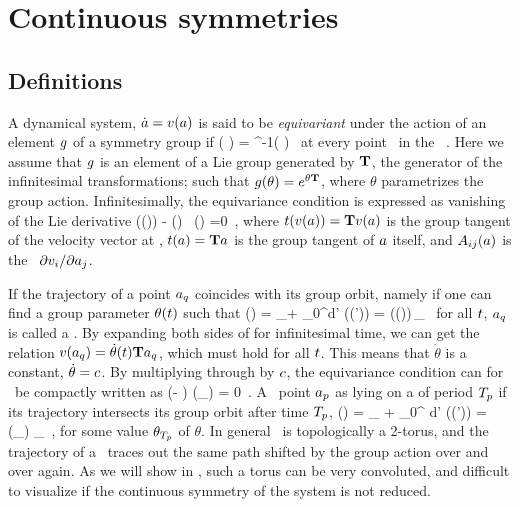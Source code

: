 \section{Continuous symmetries}
\label{s:symm}

\subsection{Definitions}
\label{s:Definitions}

A dynamical system, $\dot{a}=v(a)$ is said to be
\emph{equivariant} under the action of an element $g$ of a
symmetry group if
\beq
	\vel( \ssp ) =  \LieEl^{-1}\vel( \LieEl \ssp )
	\,
at every point \ssp\ in the \statesp\ \pS. Here we assume that $g$
is an element of a Lie group generated by $\mathbf{T}$, the generator of the
infinitesimal transformations; such that $g(\theta) = e^{\theta
\mathbf{T}}$, where $\theta$ parametrizes the group action.
Infinitesimally, the equivariance condition
is expressed as vanishing of
the Lie derivative
\beq
  \groupTan(\vel(\ssp))  - \Mvar(\ssp) \, \groupTan(\ssp) =0
  \,,
where $ t(v(a)) = \mathbf{T} v(a) $ is the group tangent of
the velocity vector at \ssp, $ t(a) = \mathbf{T} a $ is the group
tangent of $a$ itself, and $A_{ij}(a)$ is the \stabmat\
${\partial v_i}/{\partial a_j}$.

If the trajectory of a point $a_q$ coincides with its group
orbit, namely if one can find a group parameter $\theta (t)$ such
that
\beq
\ssp (\zeit)
    = \ssp_\stagn + \int_0^\zeit d\zeit' \vel(\ssp (\zeit'))
    = \LieEl (\theta (\zeit))\,\ssp_\stagn
  \,
for all $t$, $a_q$ is called a \emph{\reqv}. By expanding
both sides of \refeq{releq} for infinitesimal time, we can get the
relation $v(a_q) = \dot{\theta}(t) \mathbf{T} a_q$, which
must hold for all $t$. This means that  \emph{\phaseVel}
$\dot{\theta}$ is a constant, $\dot{\theta} = c$. By multiplying
through by $c$, the equivariance condition \refeq{inftmInv}
can for \reqva\ be compactly written as
\beq
(\velRel \Lg - \Mvar ) \vel (\ssp_\stagn) = 0
\,.
A \statesp\ point $a_{p}$ as lying on a \emph{\rpo} of period
${T_{p}}$ if its trajectory intersects its group orbit after
time ${T_{p}}$, \ie
\beq
\ssp(\period{\rpprime})
    = \ssp_\rpprime
     + \int_0^\period{\rpprime} d\tau' \vel(\ssp (\tau'))
    = \LieEl (\theta_\rpprime ) \ssp_\rpprime
  \,,
for some value $\theta_{T_{p}}$ of $\theta$. In general \rpo\ is
topologically a 2-torus, and the trajectory of a \rpo\ traces out the
same path shifted by the group action over and over again. As we will
show in \refsect{s:numerics}, such a torus can be very convoluted, and
difficult to visualize if the continuous symmetry of the system is not
reduced.

